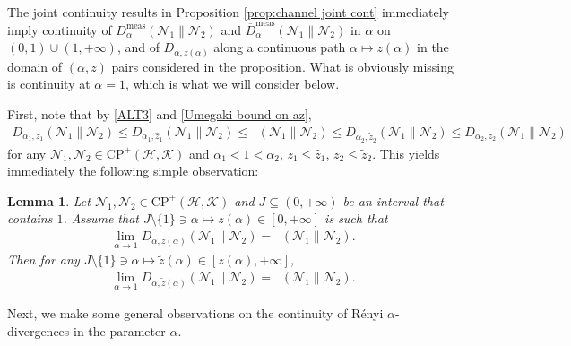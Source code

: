 \documentclass[unsortedaddress,superscriptaddress,pra,notitlepage]{revtex4}
\newtheorem{lemma}[definition]{Lemma}
\def\N{\mathcal{N}}
\def\hil{{\mathcal H}}
\def\kil{{\mathcal K}}
\def\oll{\overline}
\def\CP{\mathrm{CP}}
\def\meas{\mathrm{meas}}
\def\cpso{\text{CPSO} }
\DeclareMathOperator{\DU}{\mathit{D}^{Um}}
\begin{document}
The joint continuity results in Proposition \ref{prop:channel joint cont} immediately imply continuity of $D_{\alpha}^{\meas}(\N_1\|\N_2)$ and 
$\oll{D}_{\alpha}^{\meas}(\N_1\|\N_2)$ in $\alpha$
on $(0,1)\cup(1,+\infty)$, and of 
$D_{\alpha,z(\alpha)}$ along a continuous path $\alpha\mapsto z(\alpha)$ 
in the domain of $(\alpha,z)$ pairs considered in the proposition. 
What is obviously missing is continuity at $\alpha=1$, which is what we will consider below. 

First, note that by \eqref{ALT3} and \eqref{Umegaki bound on az},
\begin{align}\label{channel ALT}
D_{\alpha_1, z_1}(\N_1\|\N_2)
\le D_{\alpha_1,\hat z_1}(\N_1\|\N_2)
\le
\DU(\N_1\|\N_2)
\le D_{\alpha_2,\tilde z_2}(\N_1\|\N_2)
\le D_{\alpha_2,z_2}(\N_1\|\N_2)
\end{align}
for any $\N_1,\N_2\in\CP^+(\hil,\kil)$ and $\alpha_1<1<\alpha_2$, 
$z_1\le\hat z_1$, $z_2\le\tilde z_2$. 
This yields immediately the following simple observation:

\begin{lemma}\label{lemma:channel limit by domination}
Let $\N_1,\N_2\in\CP^+(\hil,\kil)$ and $J\subseteq(0,+\infty)$ be an interval that contains $1$.
Assume that $J\setminus\{1\}\ni\alpha\mapsto z(\alpha)\in[0,+\infty]$ is such that 
\begin{align*}
\lim_{\alpha\to 1}D_{\alpha,z(\alpha)}(\N_1\|\N_2)=\DU(\N_1\|\N_2).
\end{align*}
Then for any $J\setminus\{1\}\ni\alpha\mapsto \tilde z(\alpha)\in[z(\alpha),+\infty]$,
\begin{align*}
\lim_{\alpha\to 1}D_{\alpha,\tilde z(\alpha)}(\N_1\|\N_2)=\DU(\N_1\|\N_2).
\end{align*}
\end{lemma}

Next, we make some general observations
on the continuity of 
\cpso R\'enyi $\alpha$-divergences in the parameter $\alpha$.
\end{document}
